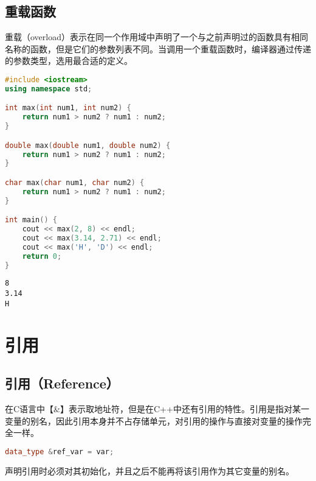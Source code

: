 \subsection{重载函数}

重载（overload）表示在同一个作用域中声明了一个与之前声明过的函数具有相同名称的函数，但是它们的参数列表不同。当调用一个重载函数时，编译器通过传递的参数类型，选用最合适的定义。 \\


\begin{lstlisting}[language=C++]
#include <iostream>
using namespace std;

int max(int num1, int num2) {
    return num1 > num2 ? num1 : num2;
}

double max(double num1, double num2) {
    return num1 > num2 ? num1 : num2;
}

char max(char num1, char num2) {
    return num1 > num2 ? num1 : num2;
}

int main() {
    cout << max(2, 8) << endl;
    cout << max(3.14, 2.71) << endl;
    cout << max('H', 'D') << endl;
    return 0;
}
\end{lstlisting}

\begin{tcolorbox}
    \begin{verbatim}
8
3.14
H
	\end{verbatim}
\end{tcolorbox}

\newpage

\section{引用}

\subsection{引用（Reference）}

在C语言中【\&】表示取地址符，但是在C++中还有引用的特性。引用是指对某一变量的别名，因此引用本身并不占存储单元，对引用的操作与直接对变量的操作完全一样。

\vspace{-0.5cm}

\begin{lstlisting}[language=C++]
data_type &ref_var = var;
\end{lstlisting}

声明引用时必须对其初始化，并且之后不能再将该引用作为其它变量的别名。 \\


